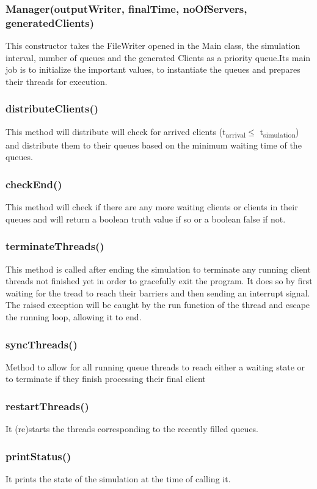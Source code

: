 \documentclass[10pt,a4paper]{article}
\begin{document}
\subsubsection{Manager(outputWriter, finalTime, noOfServers, generatedClients)}
This constructor takes the FileWriter opened in the Main class, the simulation interval, number of queues and the generated Clients as a priority queue.Its main job is to initialize the important values, to instantiate the queues and prepares their threads for execution.
\subsubsection{distributeClients()}
This method will distribute will check for arrived clients (t\textsubscript{arrival}$\leq$ t\textsubscript{simulation}) and distribute them to their queues based on the minimum waiting time of the queues.
\subsubsection{checkEnd()}
This method will check if there are any more waiting clients or clients in their queues and will return a boolean truth value if so or a boolean false if not.
\subsubsection{terminateThreads()}
This method is called after ending the simulation to terminate any running client threads not finished yet in order to gracefully exit the program. It does so by first waiting for the tread to reach their barriers and then sending an interrupt signal. The raised exception will be caught by the run function of the thread and escape the running loop, allowing it to end.
\subsubsection{syncThreads()}
Method to allow for all running queue threads to reach either a waiting state or to terminate if they finish processing their final client 
\subsubsection{restartThreads()}
It (re)starts the threads corresponding to the recently filled queues.
\subsubsection{printStatus()}
It prints the state of the simulation at the time of calling it.
\end{document}
